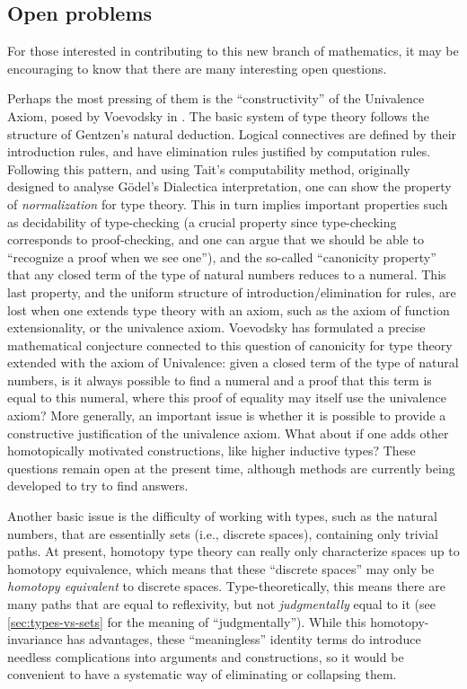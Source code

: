 \subsection*{Open problems} 

For those interested in contributing to this new branch of mathematics, it may be encouraging to know that there are many interesting open questions.

Perhaps the most pressing of them is the ``constructivity'' of the Univalence Axiom, posed by Voevodsky in \cite{Universe-poly}.
The basic system of type theory follows the structure of Gentzen's natural deduction. Logical connectives are defined by their introduction rules, and have elimination rules justified by computation rules. Following this pattern, and using Tait's computability method, originally designed to analyse G\"odel's Dialectica interpretation, one can show the property of \emph{normalization} for type theory. This in turn implies important properties such as decidability of type-checking (a crucial property since type-checking corresponds to proof-checking, and one can argue that we should be able to ``recognize a proof when we see one''), and the so-called ``canonicity property'' that any closed term of the type of natural numbers reduces to a numeral. This last property, and the uniform structure of introduction/elimination for rules, are lost when one extends type theory with an axiom, such as the axiom of function extensionality, or the univalence axiom. Voevodsky has formulated a precise mathematical conjecture connected to this question of canonicity for type theory extended with the axiom of Univalence: given a closed term of the type of natural numbers, is it always possible to find a numeral and a proof that this term is equal to this numeral, where this proof of equality may itself use the univalence axiom? More generally, an important issue is whether it is possible to provide a constructive justification of the univalence axiom.
What about if one adds other homotopically motivated constructions, like higher inductive types?
These questions remain open at the present time, although methods are currently being developed to try to find answers.

Another basic issue is the difficulty of working with types, such as the natural numbers, that are essentially sets (i.e., discrete spaces), containing only trivial paths.
At present, homotopy type theory can really only characterize spaces up to homotopy equivalence, which means that these ``discrete spaces'' may only be \emph{homotopy equivalent} to discrete spaces.
Type-theoretically, this means there are many paths that are equal to reflexivity, but not \emph{judgmentally} equal to it (see \cref{sec:types-vs-sets} for the meaning of ``judgmentally'').
While this homotopy-invariance has advantages, these ``meaningless'' identity terms do introduce needless complications into arguments and constructions, so it would be convenient to have a systematic way of eliminating or collapsing them.

